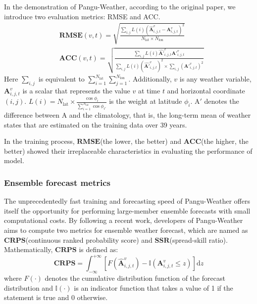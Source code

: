 \documentclass[conference]{IEEEtran}
\begin{document}
In the demonstration of Pangu-Weather, according to the original paper, we introduce two evaluation metrics: RMSE and ACC.
    \begin{align*}
        &\mathbf{RMSE}(v,t)=\sqrt{\frac{\sum_{i,j} L(i)(\hat{\mathbf{A}}_{i,j,t}^v-\mathbf{A}_{i,j,t}^v)^2}{N_{\mathrm{lat}}\times N_{\mathrm{lon}}}} \\
        &\mathbf{ACC}(v,t)=\sqrt{\frac{\sum_{i,j} L(i)\hat{\mathbf{A'}}_{i,j,t}^v \mathbf{A'}_{i,j,t}^{v}}{\sum_{i,j} L(i)(\hat{\mathbf{A'}}_{i,j,t}^v)^2 \times \sum_{i,j} (\mathbf{A'}_{i,j,t}^{v})^2}}
    \end{align*}
Here $\sum_{i,j}$ is equivalent to $\sum_{i=1}^{N_{\mathrm{lat}}}\sum_{j=1}^{N_{\mathrm{lon}}}$. Additionally, $v$ is any weather variable, $\mathbf{A}_{i,j,t}^v$ is a scalar that represents the value $v$ at time $t$ and horizontal coordinate $(i,j)$. $L(i)=N_{\mathrm{lat}}\times \frac{\cos\phi_i}{\sum_{i=1}^{N_{\mathrm{lat}}}{\cos{\phi_{i'}}}}$ is the weight at latitude $\phi_i$. $\mathrm{A}'$ denotes the difference between $\mathrm{A}$ and the climatology, that is, the long-term mean of weather states that are estimated on the training data over 39 years\cite{b15}.

In the training process, $\mathbf{RMSE}$(the lower, the better) and $\mathbf{ACC}$(the higher, the better) showed their irreplaceable characteristics in evaluating the performance of model.
\subsubsection{Ensemble forecast metrics}
The unprecedentedly fast training and forecasting speed of Pangu-Weather offers itself the opportunity for performing large-member ensemble forecasts with small computational costs. By following a recent work\cite{b16}, developers of Pangu-Weather aims to compute two metrics for ensemble weather forecast, which are named as $\mathbf{CRPS}$(continuous ranked probability score) and $\mathbf{SSR}$(spread-skill ratio). Mathematically, $\mathbf{CRPS}$ is defined as:
    \begin{equation}
        \nonumber
        \mathbf{CRPS}=\int_{-\infty}^{+\infty}[F(\hat{\mathbf{A}}_{i,j,t}^v)-\mathbb{I}(\mathbf{A}_{i,j,t}^v\leq z)]\mathrm{d}z
    \end{equation}
where $F(\cdot)$ denotes the cumulative distribution function of the forecast distribution and $\mathbb{I}(\cdot)$ is an indicator function that takes a value of 1 if the statement is true and 0 otherwise.
\end{document}
